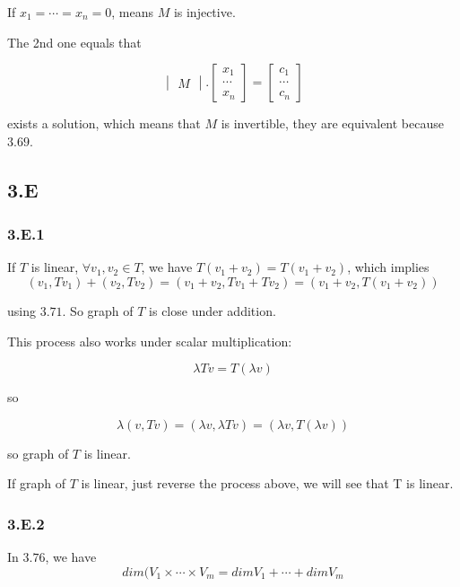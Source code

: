 If $x_{1} = \cdots = x_{n} = 0$, means $M$ is injective.

The 2nd one equals that

\begin{equation}
    \begin{vmatrix}
    M
    \end{vmatrix} . 
    \begin{bmatrix}
    x_{1} \\ \cdots \\ x_{n}
    \end{bmatrix} = 
    \begin{bmatrix}
    c_{1} \\ \cdots \\ c_{n}
    \end{bmatrix}
\end{equation}

exists a solution, which means that $M$ is invertible, 
they are equivalent because $3.69$.

\subsection*{3.E}
\subsubsection*{3.E.1}

If $T$ is linear, $\forall v_{1}, v_{2} \in T$, we have $T(v_{1} + v_{2}) = T(v_{1}+v_{2})$, which implies 
\[(v_{1}, Tv_{1}) + (v_{2}, Tv_{2}) = (v_{1}+v_{2}, Tv_{1} + Tv_{2}) = (v_{1} + v_{2}, T(v_{1} + v_{2}))\]

using $3.71$. So graph of $T$ is close under addition.

This process also works under scalar multiplication:

\[\lambda Tv = T(\lambda v)\]

so 

\[\lambda (v, Tv) = (\lambda v, \lambda Tv) = (\lambda v, T(\lambda v))\]

so graph of $T$ is linear.

If graph of $T$ is linear, just reverse the process above, we will see that T is linear.

\subsubsection*{3.E.2}

In $3.76$, we have 
\[dim(V_{1} \times \cdots \times V_{m} = dim V_{1} + \cdots + dim V_{m}\] 

